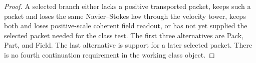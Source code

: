 \documentclass[11pt]{article}
\begin{document}
\begin{proof}
A selected branch either lacks a positive transported packet, keeps such a packet and loses the same Navier--Stokes law through the velocity tower, keeps both and loses positive-scale coherent field readout, or has not yet supplied the selected packet needed for the class test.
The first three alternatives are Pack, Part, and Field.
The last alternative is support for a later selected packet.
There is no fourth continuation requirement in the working class object.
\end{proof}

\end{document}
